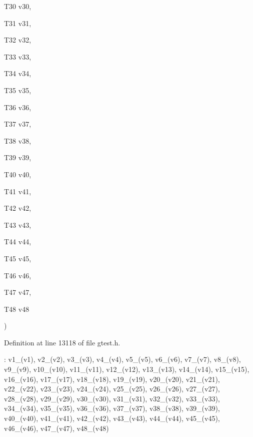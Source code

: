 {{\begin{DoxyParamCaption}
\item[{\-T30}]{v30, }
\item[{\-T31}]{v31, }
\item[{\-T32}]{v32, }
\item[{\-T33}]{v33, }
\item[{\-T34}]{v34, }
\item[{\-T35}]{v35, }
\item[{\-T36}]{v36, }
\item[{\-T37}]{v37, }
\item[{\-T38}]{v38, }
\item[{\-T39}]{v39, }
\item[{\-T40}]{v40, }
\item[{\-T41}]{v41, }
\item[{\-T42}]{v42, }
\item[{\-T43}]{v43, }
\item[{\-T44}]{v44, }
\item[{\-T45}]{v45, }
\item[{\-T46}]{v46, }
\item[{\-T47}]{v47, }
\item[{\-T48}]{v48}
\end{DoxyParamCaption}
)}}\label{d5/d2c/classtesting_1_1internal_1_1ValueArray48_a65c312eadab7960060bff7f65aae14a5}


\-Definition at line 13118 of file gtest.\-h.


\begin{DoxyCode}
                                                                     : v1_(v1),
      v2_(v2), v3_(v3), v4_(v4), v5_(v5), v6_(v6), v7_(v7), v8_(v8), v9_(v9),
      v10_(v10), v11_(v11), v12_(v12), v13_(v13), v14_(v14), v15_(v15),
      v16_(v16), v17_(v17), v18_(v18), v19_(v19), v20_(v20), v21_(v21),
      v22_(v22), v23_(v23), v24_(v24), v25_(v25), v26_(v26), v27_(v27),
      v28_(v28), v29_(v29), v30_(v30), v31_(v31), v32_(v32), v33_(v33),
      v34_(v34), v35_(v35), v36_(v36), v37_(v37), v38_(v38), v39_(v39),
      v40_(v40), v41_(v41), v42_(v42), v43_(v43), v44_(v44), v45_(v45),
      v46_(v46), v47_(v47), v48_(v48) {}
\end{DoxyCode}


